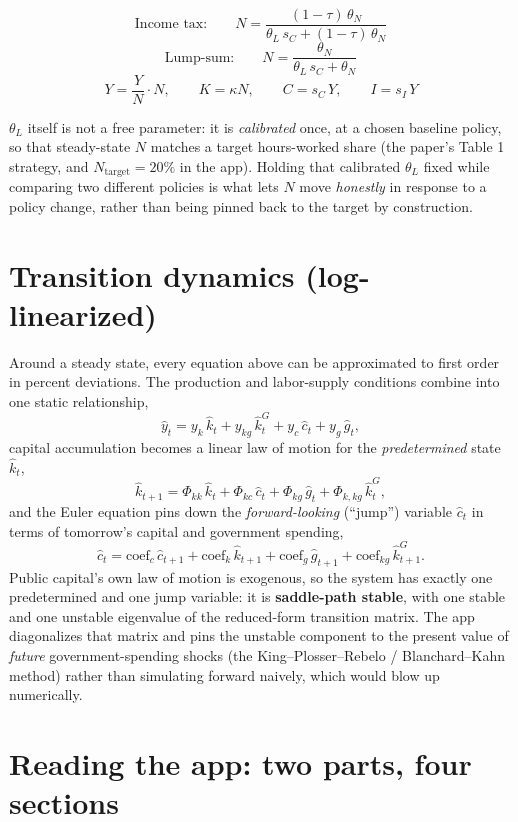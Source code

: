 \documentclass[11pt]{article}
\newcommand{\eq}[1]{\begin{equation}#1\end{equation}}
\begin{document}
\eq{ \text{Income tax:}\qquad N = \frac{(1-\tau)\,\theta_N}{\theta_L\,s_C + (1-\tau)\,\theta_N} }
\eq{ \text{Lump-sum:}\qquad N = \frac{\theta_N}{\theta_L\,s_C + \theta_N} }
\eq{ Y=\frac{Y}{N}\cdot N,\qquad K=\kappa N,\qquad C=s_C\,Y,\qquad I=s_I\,Y }

$\theta_L$ itself is not a free parameter: it is \emph{calibrated} once, at
a chosen baseline policy, so that steady-state $N$ matches a target
hours-worked share (the paper's Table 1 strategy, and $N_{\text{target}}=20\%$
in the app). Holding that calibrated $\theta_L$ fixed while comparing two
different policies is what lets $N$ move \emph{honestly} in response to a
policy change, rather than being pinned back to the target by construction.

\section{Transition dynamics (log-linearized)}

Around a steady state, every equation above can be approximated to first
order in percent deviations. The production and labor-supply conditions
combine into one static relationship,
\eq{ \hat y_t = y_k\,\hat k_t + y_{kg}\,\hat{k}^G_t + y_c\,\hat c_t + y_g\,\hat g_t, }
capital accumulation becomes a linear law of motion for the
\emph{predetermined} state $\hat k_t$,
\eq{ \hat k_{t+1} = \Phi_{kk}\,\hat k_t + \Phi_{kc}\,\hat c_t + \Phi_{kg}\,\hat g_t + \Phi_{k,kg}\,\hat{k}^G_t, }
and the Euler equation pins down the \emph{forward-looking} (``jump'')
variable $\hat c_t$ in terms of tomorrow's capital and government spending,
\eq{ \hat c_t = \text{coef}_c\,\hat c_{t+1} + \text{coef}_k\,\hat k_{t+1} + \text{coef}_g\,\hat g_{t+1} + \text{coef}_{kg}\,\hat{k}^G_{t+1}. }
Public capital's own law of motion is exogenous, so the system has exactly
one predetermined and one jump variable: it is \textbf{saddle-path stable},
with one stable and one unstable eigenvalue of the reduced-form transition
matrix. The app diagonalizes that matrix and pins the unstable component to
the present value of \emph{future} government-spending shocks (the
King--Plosser--Rebelo / Blanchard--Kahn method) rather than simulating
forward naively, which would blow up numerically.

\section{Reading the app: two parts, four sections}
\label{sec:panels}
\end{document}
